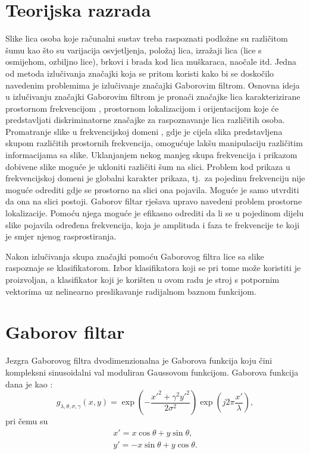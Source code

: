 \documentclass{ru}
\begin{document}
\chapter{Teorijska razrada}
Slike lica osoba koje računalni sustav treba raspoznati podložne su različitom
šumu kao što su varijacija osvjetljenja, položaj lica, izražaji lica (lice s
osmijehom, ozbiljno lice), brkovi i brada kod lica muškaraca, naočale itd. Jedna
od metoda izlučivanja značajki koja se pritom koristi kako bi se doskočilo
navedenim problemima je izlučivanje značajki Gaborovim filtrom. Osnovna ideja u
izlučivanju značajki Gaborovim filtrom je pronaći značajke lica karakterizirane
prostornom frekvencijom , prostornom lokalizacijom
 i orijentacijom koje će predstavljati diskriminatorne
značajke za raspoznavanje lica različitih osoba. Promatranje slike u
frekvencijskoj domeni , gdje je cijela slika predstavljena
skupom različitih prostornih frekvencija, omogućuje lakšu manipulaciju različitim informacijama sa slike. Uklanjanjem nekog manjeg skupa frekvencija i
prikazom dobivene slike moguće je ukloniti različiti šum na slici. Problem kod
prikaza u frekvencijskoj domeni je globalni karakter prikaza, tj.~za
pojedinu frekvenciju nije moguće odrediti gdje se prostorno na slici ona pojavila.
Moguće je samo utvrditi da ona na slici postoji. Gaborov filtar rješava
upravo navedeni problem prostorne lokalizacije. Pomoću njega moguće je efikasno
odrediti da li se u pojedinom dijelu slike pojavila određena frekvencija, koja
je amplituda i faza te frekvencije te koji je smjer njenog rasprostiranja.

Nakon izlučivanja skupa značajki pomoću Gaborovog filtra lice sa slike raspoznaje
se klasifikatorom. Izbor klasifikatora koji se pri tome može koristiti je
proizvoljan, a klasifikator koji je korišten u ovom radu je stroj s
potpornim vektorima  uz nelinearno
preslikavanje radijalnom baznom funkcijom.

\chapter{Gaborov filtar}

Jezgra Gaborovog filtra dvodimenzionalna je Gaborova funkcija koju čini
kompleksni sinusoidalni val moduliran Gaussovom funkcijom. Gaborova funkcija
dana je kao \citep{petkovgabor}:
\begin{equation}
g_{\lambda,\theta,\sigma,\gamma}(x,y) = \exp\left ( -
\frac{x'^2+\gamma^2 y'^2}{2\sigma^2}\right ) \exp \left ( j2\pi
\frac{x'}{\lambda} \right ),
\label{2d-gabor}
\end{equation}
pri čemu su
\begin{eqnarray*}
x' = x \cos \theta + y \sin \theta, \\
y' = -x \sin \theta + y \cos \theta.
\end{eqnarray*}
\end{document}
